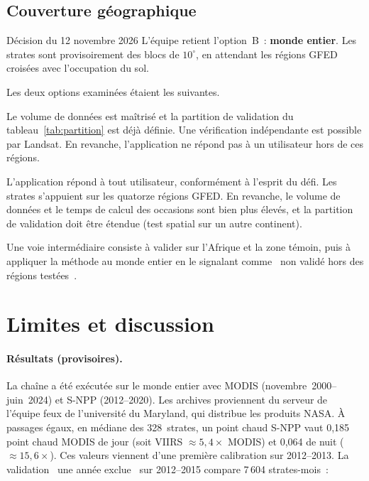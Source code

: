 \documentclass[11pt,a4paper]{article}
\newcommand{\og}{\guillemotleft~}
\newcommand{\fg}{~\guillemotright}
\begin{document}
\subsection{Couverture géographique}

\begin{decision}{Décision du 12 novembre 2026}
L'équipe retient l'option~B~: \textbf{monde entier}. Les strates sont provisoirement des blocs de $10^\circ$, en attendant les régions GFED croisées avec l'occupation du sol.
\end{decision}

Les deux options examinées étaient les suivantes.
\begin{description}[leftmargin=0.6cm,style=nextline]
  \item[Option A~: Afrique et zone témoin en Amérique du Nord.] Le volume de données est maîtrisé et la partition de validation du tableau~\ref{tab:partition} est déjà définie. Une vérification indépendante est possible par Landsat. En revanche, l'application ne répond pas à un utilisateur hors de ces régions.
  \item[Option B~: monde entier.] L'application répond à tout utilisateur, conformément à l'esprit du défi. Les strates s'appuient sur les quatorze régions GFED. En revanche, le volume de données et le temps de calcul des occasions sont bien plus élevés, et la partition de validation doit être étendue (test spatial sur un autre continent).
\end{description}
Une voie intermédiaire consiste à valider sur l'Afrique et la zone témoin, puis à appliquer la méthode au monde entier en le signalant comme \og non validé hors des régions testées\fg.

\section{Limites et discussion}\label{sec:discussion}

\paragraph{Résultats (provisoires).} La chaîne a été exécutée sur le monde entier avec MODIS (novembre~2000--juin~2024) et S-NPP (2012--2020). Les archives proviennent du serveur de l'équipe feux de l'université du Maryland, qui distribue les produits NASA. À passages égaux, en médiane des 328~strates, un point chaud S-NPP vaut 0,185 point chaud MODIS de jour (soit VIIRS $\approx 5{,}4\times$ MODIS) et 0,064 de nuit ($\approx 15{,}6\times$). Ces valeurs viennent d'une première calibration sur 2012--2013. La validation \og une année exclue\fg{} sur 2012--2015 compare 7\,604 strates-mois~:
\end{document}
